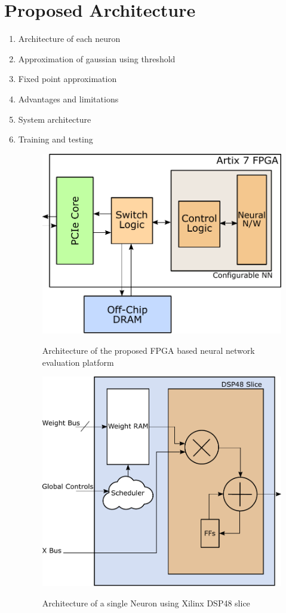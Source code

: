 \section{Proposed Architecture}
\label{sec_arch}

\begin{enumerate}
\item Architecture of each neuron
\item Approximation of gaussian using threshold
\item Fixed point approximation
\item Advantages and limitations
\item System architecture
\item Training and testing

\begin{figure}[t]
\centering
   \includegraphics[height=0.7\columnwidth]{Figures/systemarch.pdf}
   \label{fig:pnn}
   \caption{Architecture of the proposed FPGA based neural network evaluation platform}
\end{figure}

\begin{figure}[t]
\centering
   \includegraphics[height=0.7\columnwidth]{Figures/neuron.pdf}
   \label{fig:pnn}
   \caption{Architecture of a single Neuron using Xilinx DSP48 slice}
\end{figure}


\end{enumerate}
